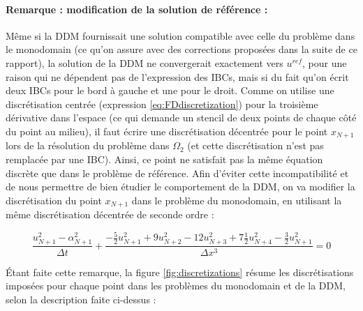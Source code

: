 \paragraph{Remarque : modification de la solution de référence :}

\indent Même si la DDM fournissait une solution compatible avec celle du problème dans le monodomain (ce qu'on assure avec des corrections proposées dans la suite de ce rapport), la solution de la DDM ne convergerait exactement vers $u^{ref}$, pour une raison qui ne dépendent pas de l'expression des IBCs, mais si du fait qu'on écrit deux IBCs pour le bord à gauche et une pour le droit. Comme on utilise une discrétisation centrée (expression \ref{eq:FDdiscretization}) pour la troisième dérivative dans l'espace (ce qui demande un stencil de deux points de chaque côté du point au milieu), il faut écrire une discrétisation décentrée pour le point $x_{N+1}$  lors de la résolution du problème dans $\Omega_2$ (et cette discrétisation n'est pas remplacée par une IBC). Ainsi, ce point ne satisfait pas la même équation discrète que dans le problème de référence. Afin d'éviter cette incompatibilité et de nous permettre de bien étudier le comportement de la DDM, on va modifier la discrétisation du point  $x_{N+1}$ dans le problème du monodomain, en utilisant la même discrétisation décentrée de seconde ordre :

\begin{equation*}
    \label{eq:uncenteredFDdiscretizationN}
    \frac{u_{N+1}^2 - \alpha_{N+1}^2}{\Delta t} + \frac{-\frac{5}{2}u_{N+1}^2 + 9u_{N+2}^2 - 12 u_{N+3}^2 + 7\frac{1}{2}u_{N+4}^2 -\frac{3}{2}u_{N+1}^2}{\Delta x ^3} = 0
\end{equation*}

\indent Étant faite cette remarque, la figure \ref{fig:discretizations} résume les discrétisations imposées pour chaque point dans les problèmes du monodomain et de la DDM, selon la description faite ci-dessus :

\indent

